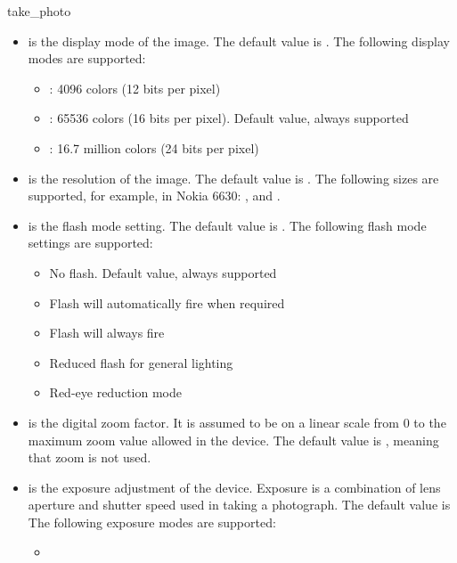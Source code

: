 \begin{funcdesc}{take_photo}{}
\begin{itemize}
\item {} is the display mode of the image. The default value is . The following display modes are supported:
	\begin{itemize}
	\item {}: 4096 colors (12 bits per pixel)
	\item {}: 65536 colors (16 bits per pixel). Default value, always supported
	\item {}: 16.7 million colors (24 bits per pixel)
	\end{itemize}
\item {} is the resolution of the image. The default value is . The following sizes are supported, for example, in Nokia 6630: ,  and .
\item {} is the flash mode setting. The default value is . The following flash mode settings are supported:
	\begin{itemize}
	\item {}No flash. Default value, always supported
	\item {}Flash will automatically fire when required
	\item {}Flash will always fire
	\item {}Reduced flash for general lighting
	\item {}Red-eye reduction mode
	\end{itemize}
\item {} is the digital zoom factor. It is assumed to be on a linear scale from 0 to the maximum zoom value allowed in the device. The default value is , meaning that zoom is not used. 
\item {} is the exposure adjustment of the device. Exposure is a combination of lens aperture and shutter speed used in taking a photograph. The default value is  The following exposure modes are supported:
	\begin{itemize}
	\item {} \newline

\end{itemize}
\end{itemize}
\end{funcdesc}
